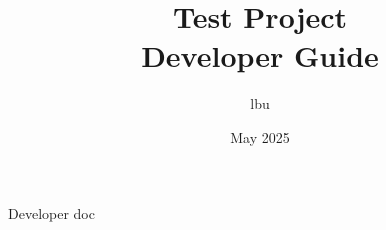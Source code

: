 \documentclass[a4paper]{report}
\title{Test Project\\ Developer Guide}
\author{lbu}
\date{May 2025}
\begin{document}
Developer doc
\end{document}
